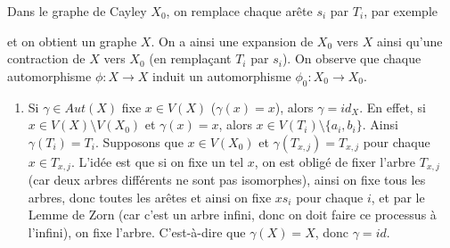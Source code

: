 \begin{preuve}
    Dans le graphe de Cayley $X_0$, on remplace chaque arête $s_i$ par $T_i$, par exemple
    \begin{center}
    \end{center}
    et on obtient un graphe $X$. On a ainsi une expansion de $X_0$ vers $X$ ainsi qu'une contraction de $X$
    vers $X_0$ (en remplaçant $T_i$ par $s_i$). On observe que chaque automorphisme $\phi: X \to X$ induit un
    automorphisme $\phi_0: X_0 \to X_0$. 
    \begin{enumerate}
    \item Si $\gamma \in Aut(X)$ fixe $x \in V(X)$ ($\gamma(x) = x$), alors $\gamma = id_X$. En effet, si $x
      \in V(X) \setminus V(X_0)$ et $\gamma(x) = x$, alors $x \in V(T_i) \setminus \{a_i, b_i\}$. Ainsi
      $\gamma(T_i) = T_i$. Supposons que $x \in V(X_0)$ et $\gamma(T_{x,j}) = T_{x,j}$ pour chaque $x \in
      T_{x,j}$. L'idée est que si on fixe un tel $x$, on est obligé de fixer l'arbre $T_{x,j}$ (car deux
      arbres différents ne sont pas isomorphes), ainsi on fixe tous les arbres, donc toutes les arêtes et
      ainsi on fixe $xs_i$ pour chaque $i$, et par le Lemme de Zorn (car c'est un arbre infini, donc on doit
      faire ce processus à l'infini), on fixe l'arbre. C'est-à-dire que $\gamma(X) = X$, donc $\gamma = id$.


\end{enumerate}
\end{preuve}
